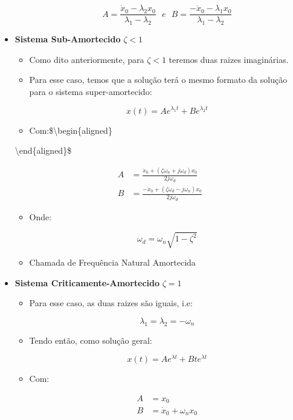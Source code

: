 \documentclass[]{article}
\begin{document}
\begin{itemize}
\begin{itemize}
      \[
        A = \frac{\dot x_0 - \lambda_2 x_0}{\lambda_1 - \lambda_2} \ \ \ e \ \ \ B = \frac{- \dot x_0 - \lambda_1 x_0}{\lambda_1 - \lambda_2}
        \]
    \end{itemize}
  \item
    \textbf{Sistema Sub-Amortecido} \(\zeta < 1\)

    \begin{itemize}
    \item
      Como dito anteriormente, para \(\zeta < 1\) teremos duas raizes
      imaginárias.
    \item
      Para esse caso, temos que a solução terá o mesmo formato da solução
      para o sistema super-amortecido:

      \[
        x(t) = Ae^{\lambda_1t} + Be^{\lambda_2t}
        \]
    \item
      Com:\$\textbackslash begin\{aligned\}
    \end{itemize}

    \textbackslash end\{aligned\}\$

    \[
      \begin{aligned}
      A &= \frac{\dot x_0 + (\zeta \omega _n + j \omega_d)x_0}{2j\omega_d} \\
      B &= \frac{-\dot x_0 + (\zeta \omega _d - j \omega_n)x_0}{2j\omega_d}
      \end{aligned}
      \]

    \begin{itemize}
    \item
      Onde:

      \[
        \omega_d = \omega_n\sqrt{1-\zeta^2}
        \]
    \item
      Chamada de Frequência Natural Amortecida
    \end{itemize}
  \item
    \textbf{Sistema Criticamente-Amortecido} \(\zeta = 1\)

    \begin{itemize}
    \item
      Para esse caso, as duas raizes são iguais, i.e:

      \[
        \lambda_1 = \lambda_2 = -\omega_n
        \]
    \item
      Tendo então, como solução geral:

      \[
        x(t) = Ae^{\lambda t} + Bte^{\lambda t}
        \]
    \item
      Com:

      \[
        \begin{aligned}
        A &= x_0 \\ 
        B &= \dot x_0 + \omega_n x_0
        \end{aligned}
        \]
    \end{itemize}
  \end{itemize}
\end{document}

